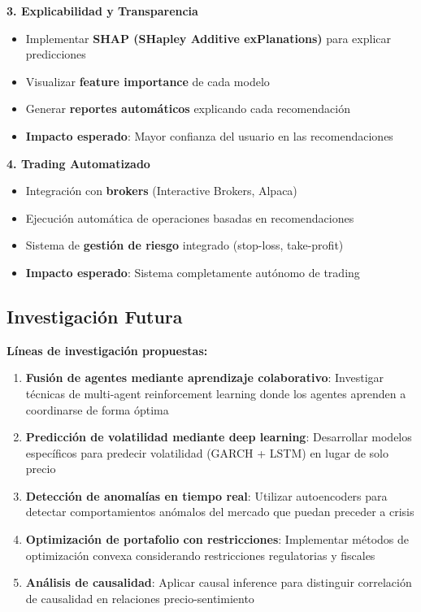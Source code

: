 \documentclass[12pt,a4paper]{report}
\begin{document}
\textbf{3. Explicabilidad y Transparencia}
\begin{itemize}
    \item Implementar \textbf{SHAP (SHapley Additive exPlanations)} para explicar predicciones
    \item Visualizar \textbf{feature importance} de cada modelo
    \item Generar \textbf{reportes automáticos} explicando cada recomendación
    \item \textbf{Impacto esperado}: Mayor confianza del usuario en las recomendaciones
\end{itemize}

\textbf{4. Trading Automatizado}
\begin{itemize}
    \item Integración con \textbf{brokers} (Interactive Brokers, Alpaca)
    \item Ejecución automática de operaciones basadas en recomendaciones
    \item Sistema de \textbf{gestión de riesgo} integrado (stop-loss, take-profit)
    \item \textbf{Impacto esperado}: Sistema completamente autónomo de trading
\end{itemize}

\subsection{Investigación Futura}

\textbf{Líneas de investigación propuestas:}

\begin{enumerate}
    \item \textbf{Fusión de agentes mediante aprendizaje colaborativo}: Investigar técnicas de multi-agent reinforcement learning donde los agentes aprenden a coordinarse de forma óptima

    \item \textbf{Predicción de volatilidad mediante deep learning}: Desarrollar modelos específicos para predecir volatilidad (GARCH + LSTM) en lugar de solo precio

    \item \textbf{Detección de anomalías en tiempo real}: Utilizar autoencoders para detectar comportamientos anómalos del mercado que puedan preceder a crisis

    \item \textbf{Optimización de portafolio con restricciones}: Implementar métodos de optimización convexa considerando restricciones regulatorias y fiscales

    \item \textbf{Análisis de causalidad}: Aplicar causal inference para distinguir correlación de causalidad en relaciones precio-sentimiento
\end{enumerate}
\end{document}
